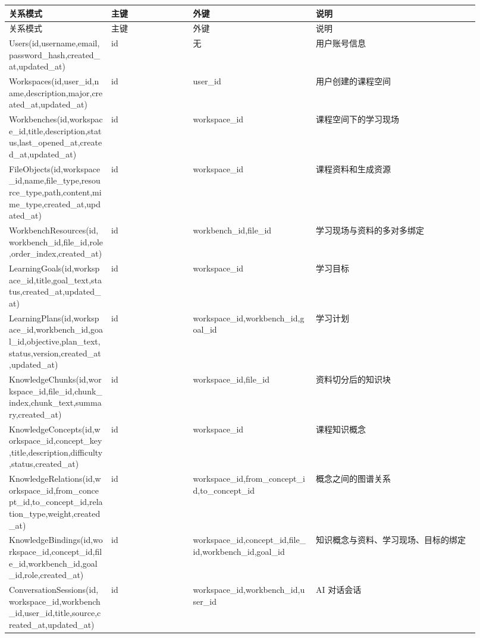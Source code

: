 \documentclass[10pt,a4paper,fontset=none]{ctexart}
\begin{document}
\begingroup\scriptsize
\renewcommand{\arraystretch}{1.18}
\setlength{\LTleft}{0pt}
\setlength{\LTright}{0pt}
\begin{longtable}{>{\raggedright\arraybackslash}p{0.20\linewidth}>{\raggedright\arraybackslash}p{0.16\linewidth}>{\raggedright\arraybackslash}p{0.24\linewidth}>{\raggedright\arraybackslash}p{0.32\linewidth}}
\toprule
关系模式 & 主键 & 外键 & 说明 \\
\midrule
\endfirsthead
\toprule
关系模式 & 主键 & 外键 & 说明 \\
\midrule
\endhead
Users(id,username,email,password\_hash,created\_at,updated\_at) & id & 无 & 用户账号信息 \\
Workspaces(id,user\_id,name,description,major,created\_at,updated\_at) & id & user\_id & 用户创建的课程空间 \\
Workbenches(id,workspace\_id,title,description,status,last\_opened\_at,created\_at,updated\_at) & id & workspace\_id & 课程空间下的学习现场 \\
FileObjects(id,workspace\_id,name,file\_type,resource\_type,path,content,mime\_type,created\_at,updated\_at) & id & workspace\_id & 课程资料和生成资源 \\
WorkbenchResources(id,workbench\_id,file\_id,role,order\_index,created\_at) & id & workbench\_id,file\_id & 学习现场与资料的多对多绑定 \\
LearningGoals(id,workspace\_id,title,goal\_text,status,created\_at,updated\_at) & id & workspace\_id & 学习目标 \\
LearningPlans(id,workspace\_id,workbench\_id,goal\_id,objective,plan\_text,status,version,created\_at,updated\_at) & id & workspace\_id,workbench\_id,goal\_id & 学习计划 \\
KnowledgeChunks(id,workspace\_id,file\_id,chunk\_index,chunk\_text,summary,created\_at) & id & workspace\_id,file\_id & 资料切分后的知识块 \\
KnowledgeConcepts(id,workspace\_id,concept\_key,title,description,difficulty,status,created\_at) & id & workspace\_id & 课程知识概念 \\
KnowledgeRelations(id,workspace\_id,from\_concept\_id,to\_concept\_id,relation\_type,weight,created\_at) & id & workspace\_id,from\_concept\_id,to\_concept\_id & 概念之间的图谱关系 \\
KnowledgeBindings(id,workspace\_id,concept\_id,file\_id,workbench\_id,goal\_id,role,created\_at) & id & workspace\_id,concept\_id,file\_id,workbench\_id,goal\_id & 知识概念与资料、学习现场、目标的绑定 \\
ConversationSessions(id,workspace\_id,workbench\_id,user\_id,title,source,created\_at,updated\_at) & id & workspace\_id,workbench\_id,user\_id & AI 对话会话 \\

\end{longtable}
\end{document}

